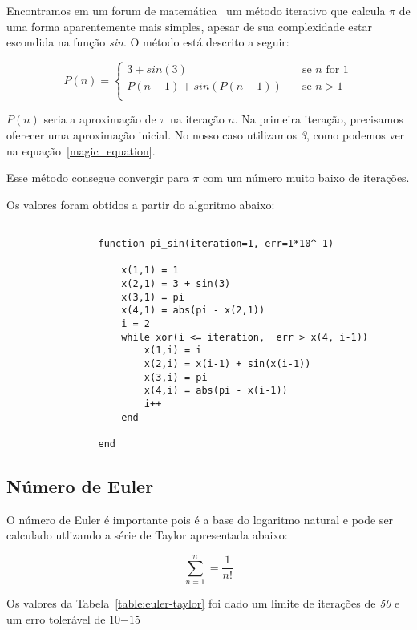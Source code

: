 			Encontramos em um forum de matemática~\cite{mathForum} um método
			iterativo que calcula $\pi$ de uma forma aparentemente mais simples,
			apesar de sua complexidade estar escondida na função \emph{sin}. O
			método está descrito a seguir:

			\begin{equation}
			\label{magic_equation}
				P(n) =
				\begin{cases}
					3 + sin (3) & \quad \text{se } n \text{\ for } 1\\
					P(n-1) + sin(P(n-1)) & \quad \text{se } n > 1\\
				\end{cases}
			\end{equation}

			$P(n)$ seria a aproximação de $\pi$ na iteração $n$. Na primeira
			iteração, precisamos oferecer uma aproximação inicial. No nosso caso
			utilizamos \emph{3}, como podemos ver na
			equação~\ref{magic_equation}.

			Esse método consegue convergir para $\pi$ com um número muito baixo
			de iterações.

			

			Os valores foram obtidos a partir do algoritmo abaixo:

			\begin{lstlisting}

				function pi_sin(iteration=1, err=1*10^-1)

					x(1,1) = 1
					x(2,1) = 3 + sin(3)
					x(3,1) = pi
					x(4,1) = abs(pi - x(2,1))
					i = 2
					while xor(i <= iteration,  err > x(4, i-1))
						x(1,i) = i
						x(2,i) = x(i-1) + sin(x(i-1))
						x(3,i) = pi
						x(4,i) = abs(pi - x(i-1))
						i++
					end

				end

			\end{lstlisting}

	\subsection{Número de Euler}

		O número de Euler é importante pois é a base do logaritmo natural
		e pode ser calculado utlizando a série de Taylor apresentada
		abaixo: 

		\begin{equation}
			\sum_{n=1}^{n} = \frac{1}{n!}
		\end{equation}

		Os valores da Tabela~\ref{table:euler-taylor} foi dado um limite de
		iterações de \emph{50} e um erro tolerável de $10{-15}$

